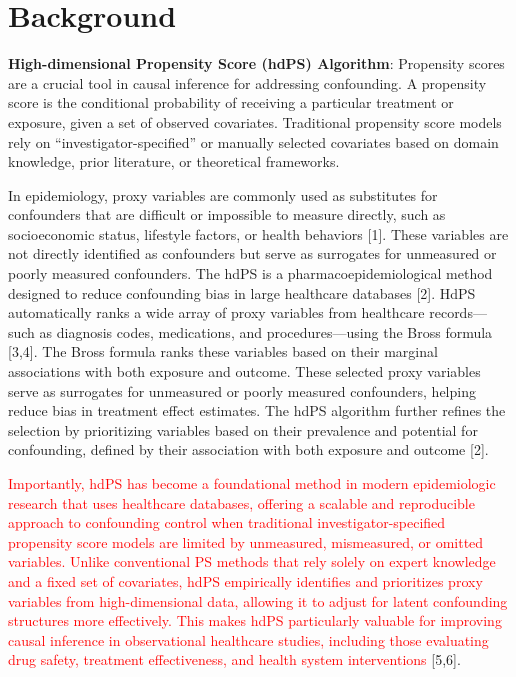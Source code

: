 \documentclass[10pt,letterpaper]{article}
\begin{document}

\linenumbers

\section{Background}\label{background}

\textbf{High-dimensional Propensity Score (hdPS) Algorithm}: Propensity
scores are a crucial tool in causal inference for addressing
confounding. A propensity score is the conditional probability of
receiving a particular treatment or exposure, given a set of observed
covariates. Traditional propensity score models rely on
``investigator-specified'' or manually selected covariates based on
domain knowledge, prior literature, or theoretical frameworks.

In epidemiology, proxy variables are commonly used as substitutes for
confounders that are difficult or impossible to measure directly, such
as socioeconomic status, lifestyle factors, or health behaviors {[}1{]}.
These variables are not directly identified as confounders but serve as
surrogates for unmeasured or poorly measured confounders. The hdPS is a
pharmacoepidemiological method designed to reduce confounding bias in
large healthcare databases {[}2{]}. HdPS automatically ranks a wide
array of proxy variables from healthcare records---such as diagnosis
codes, medications, and procedures---using the Bross formula {[}3,4{]}.
The Bross formula ranks these variables based on their marginal
associations with both exposure and outcome. These selected proxy
variables serve as surrogates for unmeasured or poorly measured
confounders, helping reduce bias in treatment effect estimates. The hdPS
algorithm further refines the selection by prioritizing variables based
on their prevalence and potential for confounding, defined by their
association with both exposure and outcome {[}2{]}.

\textcolor{red}{Importantly, hdPS has become a foundational method in modern epidemiologic research that uses healthcare databases, offering a scalable and reproducible approach to confounding control when traditional investigator-specified propensity score models are limited by unmeasured, mismeasured, or omitted variables. Unlike conventional PS methods that rely solely on expert knowledge and a fixed set of covariates, hdPS empirically identifies and prioritizes proxy variables from high-dimensional data, allowing it to adjust for latent confounding structures more effectively. This makes hdPS particularly valuable for improving causal inference in observational healthcare studies, including those evaluating drug safety, treatment effectiveness, and health system interventions}
{[}5,6{]}.
\end{document}
